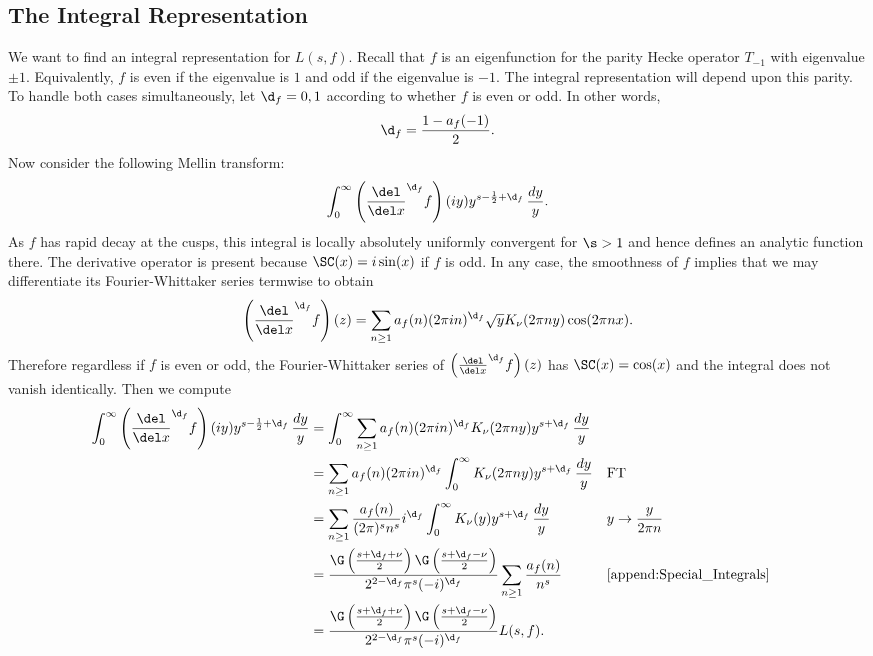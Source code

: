     \subsection*{The Integral Representation}
      We want to find an integral representation for $L(s,f)$. Recall that $f$ is an eigenfunction for the parity Hecke operator $T_{-1}$ with eigenvalue $\pm 1$. Equivalently, $f$ is even if the eigenvalue is $1$ and odd if the eigenvalue is $-1$. The integral representation will depend upon this parity. To handle both cases simultaneously, let $\d_{f} = 0,1$ according to whether $f$ is even or odd. In other words,
      \[
        \d_{f} = \frac{1-a_{f}(-1)}{2}.
      \]
      Now consider the following Mellin transform:
      \[
        \int_{0}^{\infty}\left(\frac{\del}{\del x}^{\d_{f}}f\right)(iy)y^{s-\frac{1}{2}+\d_{f}}\,\frac{dy}{y}.
      \]
      As $f$ has rapid decay at the cusps, this integral is locally absolutely uniformly convergent for $\s > 1$ and hence defines an analytic function there. The derivative operator is present because $\SC(x) = i\sin(x)$ if $f$ is odd. In any case, the smoothness of $f$ implies that we may differentiate its Fourier-Whittaker series termwise to obtain
      \[
        \left(\frac{\del}{\del x}^{\d_{f}}f\right)(z) = \sum_{n \ge 1}a_{f}(n)(2\pi in)^{\d_{f}}\sqrt{y}K_{\nu}(2\pi ny)\cos(2\pi nx).
      \]
      Therefore regardless if $f$ is even or odd, the Fourier-Whittaker series of $\left(\frac{\del}{\del x}^{\d_{f}}f\right)(z)$ has $\SC(x) = \cos(x)$ and the integral does not vanish identically. Then we compute
      \begin{align*}
        \int_{0}^{\infty}\left(\frac{\del}{\del x}^{\d_{f}}f\right)(iy)y^{s-\frac{1}{2}+\d_{f}}\,\frac{dy}{y} &= \int_{0}^{\infty}\sum_{n \ge 1}a_{f}(n)(2\pi in)^{\d_{f}}K_{\nu}(2\pi ny)y^{s+\d_{f}}\,\frac{dy}{y} \\
        &= \sum_{n \ge 1}a_{f}(n)(2\pi in)^{\d_{f}}\int_{0}^{\infty}K_{\nu}(2\pi ny)y^{s+\d_{f}}\,\frac{dy}{y} &&\text{FT} \\
        &= \sum_{n \ge 1}\frac{a_{f}(n)}{(2\pi)^{s}n^{s}}i^{\d_{f}}\int_{0}^{\infty}K_{\nu}(y)y^{s+\d_{f}}\,\frac{dy}{y} &&\text{$y \to \frac{y}{2\pi n}$} \\
        &= \frac{\G\left(\frac{s+\d_{f}+\nu}{2}\right)\G\left(\frac{s+\d_{f}-\nu}{2}\right)}{2^{2-\d_{f}}\pi^{s}(-i)^{\d_{f}}}\sum_{n \ge 1}\frac{a_{f}(n)}{n^{s}} && \text{\cref{append:Special_Integrals}} \\
        &= \frac{\G\left(\frac{s+\d_{f}+\nu}{2}\right)\G\left(\frac{s+\d_{f}-\nu}{2}\right)}{2^{2-\d_{f}}\pi^{s}(-i)^{\d_{f}}}L(s,f).
      \end{align*}

